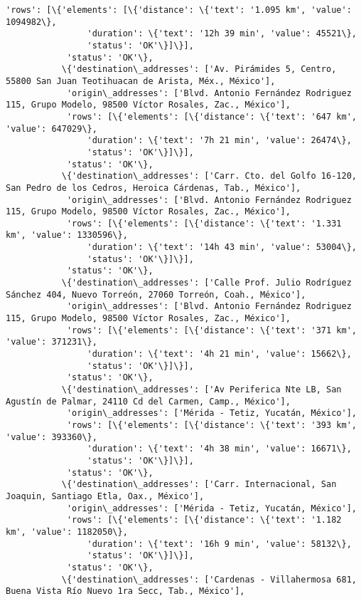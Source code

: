 \documentclass[11pt]{article}
\begin{document}
\begin{Verbatim}[commandchars=\\\{\}]
            'rows': [\{'elements': [\{'distance': \{'text': '1.095 km', 'value': 1094982\},
                'duration': \{'text': '12h 39 min', 'value': 45521\},
                'status': 'OK'\}]\}],
            'status': 'OK'\},
           \{'destination\_addresses': ['Av. Pirámides 5, Centro, 55800 San Juan Teotihuacan de Arista, Méx., México'],
            'origin\_addresses': ['Blvd. Antonio Fernández Rodriguez 115, Grupo Modelo, 98500 Víctor Rosales, Zac., México'],
            'rows': [\{'elements': [\{'distance': \{'text': '647 km', 'value': 647029\},
                'duration': \{'text': '7h 21 min', 'value': 26474\},
                'status': 'OK'\}]\}],
            'status': 'OK'\},
           \{'destination\_addresses': ['Carr. Cto. del Golfo 16-120, San Pedro de los Cedros, Heroica Cárdenas, Tab., México'],
            'origin\_addresses': ['Blvd. Antonio Fernández Rodriguez 115, Grupo Modelo, 98500 Víctor Rosales, Zac., México'],
            'rows': [\{'elements': [\{'distance': \{'text': '1.331 km', 'value': 1330596\},
                'duration': \{'text': '14h 43 min', 'value': 53004\},
                'status': 'OK'\}]\}],
            'status': 'OK'\},
           \{'destination\_addresses': ['Calle Prof. Julio Rodríguez Sánchez 404, Nuevo Torreón, 27060 Torreón, Coah., México'],
            'origin\_addresses': ['Blvd. Antonio Fernández Rodriguez 115, Grupo Modelo, 98500 Víctor Rosales, Zac., México'],
            'rows': [\{'elements': [\{'distance': \{'text': '371 km', 'value': 371231\},
                'duration': \{'text': '4h 21 min', 'value': 15662\},
                'status': 'OK'\}]\}],
            'status': 'OK'\},
           \{'destination\_addresses': ['Av Periferica Nte LB, San Agustín de Palmar, 24110 Cd del Carmen, Camp., México'],
            'origin\_addresses': ['Mérida - Tetiz, Yucatán, México'],
            'rows': [\{'elements': [\{'distance': \{'text': '393 km', 'value': 393360\},
                'duration': \{'text': '4h 38 min', 'value': 16671\},
                'status': 'OK'\}]\}],
            'status': 'OK'\},
           \{'destination\_addresses': ['Carr. Internacional, San Joaquin, Santiago Etla, Oax., México'],
            'origin\_addresses': ['Mérida - Tetiz, Yucatán, México'],
            'rows': [\{'elements': [\{'distance': \{'text': '1.182 km', 'value': 1182050\},
                'duration': \{'text': '16h 9 min', 'value': 58132\},
                'status': 'OK'\}]\}],
            'status': 'OK'\},
           \{'destination\_addresses': ['Cardenas - Villahermosa 681, Buena Vista Río Nuevo 1ra Secc, Tab., México'],

\end{Verbatim}
\end{document}
